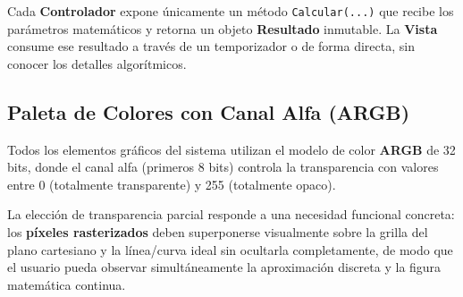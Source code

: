 \documentclass[
  spanish,
  a4paper,
  12pt,
]{article}
\newcommand{\passthrough}[1]{#1}
\begin{document}
Cada \textbf{Controlador} expone únicamente un método
\passthrough{\lstinline!Calcular(...)!} que recibe los parámetros
matemáticos y retorna un objeto \textbf{Resultado} inmutable. La
\textbf{Vista} consume ese resultado a través de un temporizador o de
forma directa, sin conocer los detalles algorítmicos.

\subsection{Paleta de Colores con Canal Alfa
(ARGB)}\label{paleta-de-colores-con-canal-alfa-argb}

Todos los elementos gráficos del sistema utilizan el modelo de color
\textbf{ARGB} de 32 bits, donde el canal alfa (primeros 8 bits) controla
la transparencia con valores entre 0 (totalmente transparente) y 255
(totalmente opaco).

La elección de transparencia parcial responde a una necesidad funcional
concreta: los \textbf{píxeles rasterizados} deben superponerse
visualmente sobre la grilla del plano cartesiano y la línea/curva ideal
sin ocultarla completamente, de modo que el usuario pueda observar
simultáneamente la aproximación discreta y la figura matemática
continua.
\end{document}
